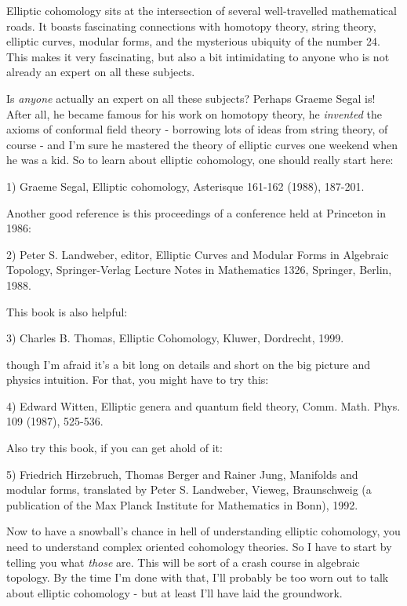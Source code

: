 

Elliptic cohomology sits at the intersection of several well-travelled
mathematical roads.  It boasts fascinating connections with homotopy
theory, string theory, elliptic curves, modular forms, and the mysterious 
ubiquity of the number 24.  This makes it very fascinating, but also a bit 
intimidating to anyone who is not already an expert on all these subjects.  

Is \emph{anyone} 
actually an expert on all these subjects?  Perhaps Graeme Segal 
is!  After all, he became famous for his work on homotopy theory, he 
\emph{invented} the axioms of conformal field theory - borrowing lots of 
ideas from string theory, of course - and I'm sure he mastered the 
theory of elliptic curves one weekend when he was a kid.  So to learn 
about elliptic cohomology, one should really start here:

1) Graeme Segal, Elliptic cohomology, Asterisque 161-162 (1988), 187-201.  

Another good reference is this proceedings of a conference held at 
Princeton in 1986:

2) Peter S. Landweber, editor, Elliptic Curves and Modular Forms in
Algebraic Topology, Springer-Verlag Lecture Notes in Mathematics 1326,
Springer, Berlin, 1988.

This book is also helpful:

3) Charles B. Thomas, Elliptic Cohomology, Kluwer, Dordrecht, 1999.   

though I'm afraid it's a bit long on details and short on the big 
picture and physics intuition.  For that, you might have to try this:

4) Edward Witten, Elliptic genera and quantum field theory, Comm.
Math. Phys. 109 (1987), 525-536.

Also try this book, if you can get ahold of it:

5) Friedrich Hirzebruch, Thomas Berger and Rainer Jung, Manifolds 
and modular forms, translated by Peter S. Landweber, Vieweg, 
Braunschweig (a publication of the Max Planck Institute for 
Mathematics in Bonn), 1992.

Now to have a snowball's chance in hell of understanding elliptic
cohomology, you need to understand complex oriented cohomology theories.
So I have to start by telling you what \emph{those} are.  This will be sort
of a crash course in algebraic topology.  By the time I'm done with that,
I'll probably be too worn out to talk about elliptic cohomology - but
at least I'll have laid the groundwork.

